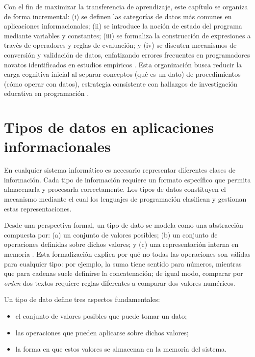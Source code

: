 \documentclass[12pt,twoside]{book}
\begin{document}
			Con el fin de maximizar la transferencia de aprendizaje, este capítulo se organiza de forma incremental: (i) se definen las categorías de datos más comunes en aplicaciones informacionales; (ii) se introduce la noción de estado del programa mediante variables y constantes; (iii) se formaliza la construcción de expresiones a través de operadores y reglas de evaluación; y (iv) se discuten mecanismos de conversión y validación de datos, enfatizando errores frecuentes en programadores novatos identificados en estudios empíricos \cite{Qian2018Students,Robins2003Learning}. Esta organización busca reducir la carga cognitiva inicial al separar conceptos (qué es un dato) de procedimientos (cómo operar con datos), estrategia consistente con hallazgos de investigación educativa en programación \cite{Lister2004Learning}.
			
			\section{Tipos de datos en aplicaciones informacionales}
				\noindent
				En cualquier sistema informático es necesario representar diferentes clases de información. Cada tipo de información requiere un formato específico que permita almacenarla y procesarla correctamente. Los tipos de datos constituyen el mecanismo mediante el cual los lenguajes de programación clasifican y gestionan estas representaciones.
				
				Desde una perspectiva formal, un tipo de dato se modela como una abstracción compuesta por: (a) un conjunto de valores posibles; (b) un conjunto de operaciones definidas sobre dichos valores; y (c) una representación interna en memoria \cite{Pierce2002Types,Sebesta2018Concepts}. Esta formalización explica por qué no todas las operaciones son válidas para cualquier tipo: por ejemplo, la suma tiene sentido para números, mientras que para cadenas suele definirse la concatenación; de igual modo, comparar por \textit{orden} dos textos requiere reglas diferentes a comparar dos valores numéricos.
				
				Un tipo de dato define tres aspectos fundamentales:
				
				\begin{itemize}
					\item el conjunto de valores posibles que puede tomar un dato;
					\item las operaciones que pueden aplicarse sobre dichos valores;
					\item la forma en que estos valores se almacenan en la memoria del sistema.
				\end{itemize}
				
\end{document}
